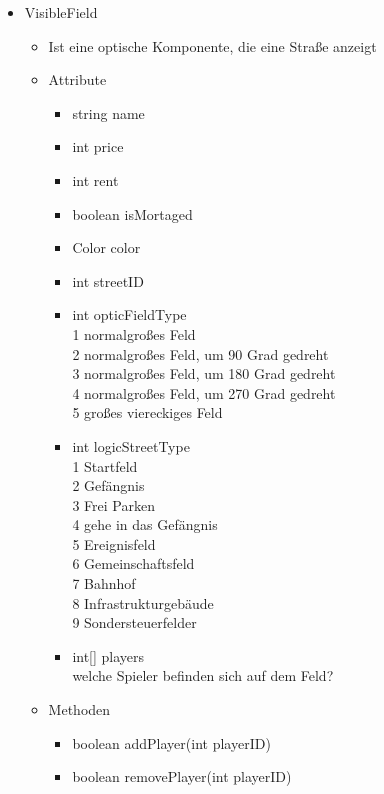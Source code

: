 \documentclass[a4paper,10pt]{article}
\begin{document}
\begin{itemize}
\item VisibleField
\begin{itemize}
\item Ist eine optische Komponente, die eine Straße anzeigt
\item Attribute
\begin{itemize}
\item string name
\item int price
\item int rent
\item boolean isMortaged
\item Color color
\item int streetID
\item int opticFieldType
\\1 normalgroßes Feld
\\2 normalgroßes Feld, um 90 Grad gedreht
\\3 normalgroßes Feld, um 180 Grad gedreht
\\4 normalgroßes Feld, um 270 Grad gedreht
\\5 großes viereckiges Feld
\item int logicStreetType
\\1 Startfeld
\\2 Gefängnis
\\3 Frei Parken
\\4 gehe in das Gefängnis
\\5 Ereignisfeld
\\6 Gemeinschaftsfeld
\\7 Bahnhof
\\8 Infrastrukturgebäude
\\9 Sondersteuerfelder
\item int[] players
\\welche Spieler befinden sich auf dem Feld?
\end{itemize}
\item Methoden
\begin{itemize}
\item boolean addPlayer(int playerID)
\item boolean removePlayer(int playerID)
\end{itemize}
\end{itemize}


\end{itemize}
\end{document}
